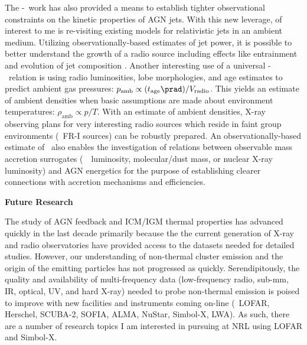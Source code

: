 \documentclass[12pt]{article}
\begin{document}
The \pjet-\prad\ work has also provided a means to establish tighter
observational constraints on the kinetic properties of AGN jets. With
this new leverage, of interest to me is re-visiting existing models
for relativistic jets in an ambient medium. Utilizing
observationally-based estimates of jet power, it is possible to better
understand the growth of a radio source including effects like
entrainment and evolution of jet composition \cite[\'a
  la][]{1999MNRAS.309.1017W}. Another interesting use of a universal
\pjet-\prad\ relation is using radio luminosities, lobe morphologies,
and age estimates to predict ambient gas pressures: $p_{\mathrm{amb}}
\propto (t_{\mathrm{age}}\prad) / V_{\mathrm{radio}}$. This yields an
estimate of ambient densities when basic assumptions are made about
environment temperatures: $\rho_{\mathrm{amb}} \propto p/T$. With an
estimate of ambient densities, X-ray observing plans for very
interesting radio sources which reside in faint group environments
(\ie\ FR-I sources) can be robustly prepared. An observationally-based
estimate of \pjet\ also enables the investigation of relations between
observable mass accretion surrogates (\ie\ \halpha\ luminosity,
molecular/dust mass, or nuclear X-ray luminosity) and AGN energetics
for the purpose of establishing clearer connections with accretion
mechanisms and efficiencies.

{\bf{Future Research}}

The study of AGN feedback and ICM/IGM thermal properties has advanced
quickly in the last decade primarily because the the current
generation of X-ray and radio observatories have provided access to
the datasets needed for detailed studies. However, our understanding
of non-thermal cluster emission and the origin of the emitting
particles has not progressed as quickly. Serendipitously, the quality
and availability of multi-frequency data (low-frequency radio, sub-mm,
IR, optical, UV, and hard X-ray) needed to probe non-thermal emission
is poised to improve with new facilities and instruments coming
on-line (\ie\ LOFAR, Herschel, SCUBA-2, SOFIA, ALMA, NuStar, Simbol-X,
LWA). As such, there are a number of research topics I am interested
in pursuing at NRL using LOFAR and Simbol-X.
\end{document}
